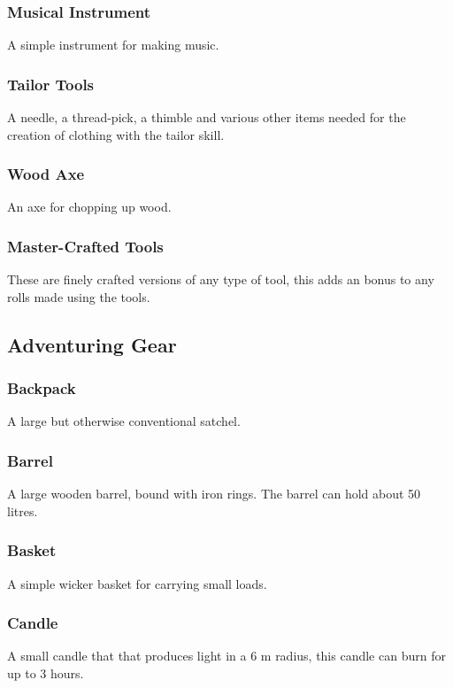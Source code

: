 \subsubsection*{Musical Instrument}
A simple instrument for making music.

\subsubsection*{Tailor Tools}
A needle, a thread-pick, a thimble and various other items needed for the creation of clothing with the tailor skill.

\subsubsection*{Wood Axe}
An axe for chopping up wood.

\subsubsection*{Master-Crafted Tools}
These are finely crafted versions of any type of tool, this adds an  bonus to any rolls made using the tools.

\subsection{Adventuring Gear}

\subsubsection*{Backpack}
A large but otherwise conventional satchel.

\subsubsection*{Barrel}
A large wooden barrel, bound with iron rings. The barrel can hold about 50 litres.

\subsubsection*{Basket}
A simple wicker basket for carrying small loads.

\subsubsection*{Candle}
A small candle that that produces  light in a 6 m radius, this candle can burn for up to 3 hours.

